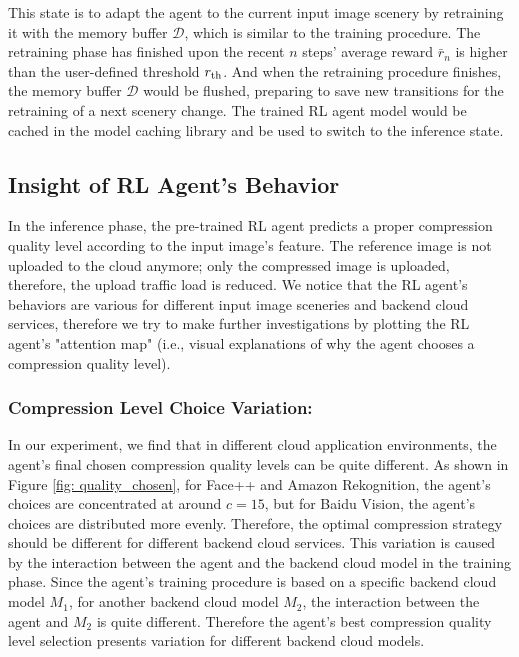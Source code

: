This state is to adapt the agent to the current input image scenery by retraining it with the memory buffer $ \mathcal{D} $, which is similar to the training procedure. The retraining phase has finished upon the recent $ n $ steps' average reward $ \bar{r}_n $ is higher than the user-defined threshold $ r_{\rm th} $. And when the retraining procedure finishes, the memory buffer $ \mathcal{D} $ would be flushed, preparing to save new transitions for the retraining of a next scenery change. The trained RL agent model would be cached in the model caching library and be used to switch to the inference state.

\subsection{Insight of RL Agent's Behavior}
\label{subsec:insight}

In the inference phase, the pre-trained RL agent predicts a proper compression quality level according to the input image's feature. The reference image is not uploaded to the cloud anymore; only the compressed image is uploaded, therefore, the upload traffic load is reduced. We notice that the RL agent's behaviors are various for different input image sceneries and backend cloud services, therefore we try to make further investigations by plotting the RL agent's "attention map" (i.e., visual explanations of why the agent chooses a compression quality level). %

\subsubsection{\textbf{Compression Level Choice Variation:}}

In our experiment, we find that in different cloud application environments, the agent's final chosen compression quality levels can be quite different. As shown in Figure \ref{fig: quality_chosen}, for Face++ and Amazon Rekognition, the agent's choices are concentrated at around $ c=15 $, but for Baidu Vision, the agent's choices are distributed more evenly. Therefore, the optimal compression strategy should be different for different backend cloud services. This variation is caused by the interaction between the agent and the backend cloud model in the training phase. Since the agent's training procedure is based on a specific backend cloud model $ M_1 $, for another backend cloud model $ M_2 $, the interaction between the agent and $ M_2 $ is quite different. Therefore the agent's best compression quality level selection presents variation for different backend cloud models.  

